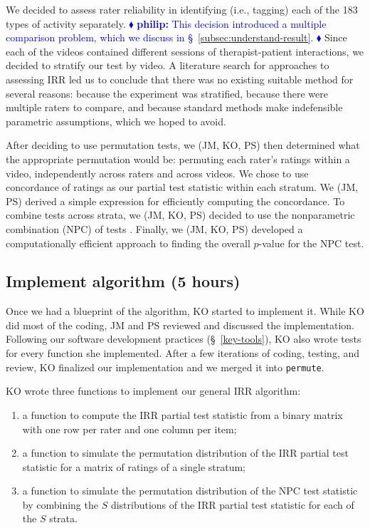 \documentclass[]{article}
\newcommand{\philip}[1] { \textcolor{blue} {
\ensuremath{\blacklozenge} {\bf philip:}  {#1}
\ensuremath{\blacklozenge} } }
\begin{document}
We decided to assess rater reliability in identifying (i.e., tagging)
each of the 183 types of activity separately.
\philip{
This decision introduced a multiple comparison problem, which we discuss in
\S~\ref{subsec:understand-result}.
}
Since each of the videos contained different sessions of therapist-patient
interactions, we decided to stratify our test by video.
A literature search for approaches to assessing IRR led us to conclude that
there was no existing suitable method for several reasons:
because the experiment was stratified,
because there were multiple raters to compare,
and because standard methods make indefensible parametric
assumptions, which we hoped to avoid.

After deciding to use permutation tests, we (JM, KO, PS) then determined what
the appropriate permutation would be: permuting each rater's ratings within a
video, independently across raters and across videos.
We chose to use concordance of ratings as our partial test statistic within
each stratum.
We (JM, PS) derived a simple expression for efficiently computing the
concordance.
To combine tests across strata, we (JM, KO, PS) decided to use the nonparametric
combination (NPC) of tests \citep{pesarin2010permutation}.
Finally, we (JM, KO, PS) developed a computationally efficient approach to
finding the overall $p$-value for the NPC test.

\subsection{Implement algorithm (5 hours)}

Once we had a blueprint of the algorithm, KO started to implement it.
While KO did most of the coding, JM and PS reviewed and discussed the
implementation.
Following our software development practices (\S~\ref{key-tools}), KO also
wrote tests for every function she implemented.
After a few iterations of coding, testing, and review, KO finalized our implementation
and we merged it into \texttt{permute}.

KO wrote three functions to implement our general IRR algorithm:
\begin{enumerate}
\item a function to compute the IRR partial test statistic from a binary
  matrix with one row per rater and one column per item;
\item a function to simulate the permutation distribution of the IRR partial
  test statistic for a matrix of ratings of a single stratum;
\item a function to simulate the permutation distribution of the NPC
  test statistic by combining the $S$ distributions of the IRR partial test 
  statistic for each of the $S$ strata.
\end{enumerate}
\end{document}
